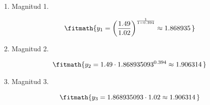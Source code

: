 \begin{enumerate}

\item Magnitud 1.

\[\fitmath{y_{1}={\left(\frac{1.49}{1.02}\right)}^{\frac{1}{1-0.394}}\approx 1.868935\,}\]

\item Magnitud 2.

\[\fitmath{y_{2}=1.49\cdot {1.868935093}^{0.394}\approx 1.906314\,}\]

\item Magnitud 3.

\[\fitmath{y_{3}=1.868935093\cdot 1.02\approx 1.906314\,}\]

\end{enumerate}
